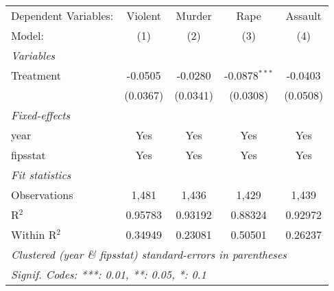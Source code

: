 
\begingroup
\centering
\begin{tabular}{lcccc}
   \tabularnewline \midrule \midrule
   Dependent Variables: & Violent  & Murder   & Rape            & Assault\\  
   Model:               & (1)      & (2)      & (3)             & (4)\\  
   \midrule
   \emph{Variables}\\
   Treatment            & -0.0505  & -0.0280  & -0.0878$^{***}$ & -0.0403\\   
                        & (0.0367) & (0.0341) & (0.0308)        & (0.0508)\\   
   \midrule
   \emph{Fixed-effects}\\
   year                 & Yes      & Yes      & Yes             & Yes\\  
   fipsstat             & Yes      & Yes      & Yes             & Yes\\  
   \midrule
   \emph{Fit statistics}\\
   Observations         & 1,481    & 1,436    & 1,429           & 1,439\\  
   R$^2$                & 0.95783  & 0.93192  & 0.88324         & 0.92972\\  
   Within R$^2$         & 0.34949  & 0.23081  & 0.50501         & 0.26237\\  
   \midrule \midrule
   \multicolumn{5}{l}{\emph{Clustered (year \& fipsstat) standard-errors in parentheses}}\\
   \multicolumn{5}{l}{\emph{Signif. Codes: ***: 0.01, **: 0.05, *: 0.1}}\\
\end{tabular}
\par\endgroup



